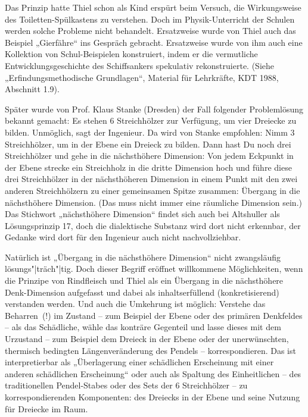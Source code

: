 \documentclass[11pt,a4paper]{article}
\begin{document}
Das Prinzip hatte Thiel schon als Kind erspürt beim Versuch, die Wirkungsweise
des Toiletten-Spülkastens zu verstehen. Doch im Physik-Unterricht der Schulen
werden solche Probleme nicht behandelt.  Ersatzweise wurde von Thiel auch das
Beispiel „Gierfähre“ ins Gespräch gebracht. Ersatzweise wurde von ihm auch eine
Kollektion von Schul-Beispielen konstruiert, indem er die vermutliche
Entwicklungsgeschichte des Schiffsankers spekulativ rekonstruierte. (Siehe
„Erfindungsmethodische Grundlagen“, Material für Lehrkräfte, KDT 1988,
Abschnitt 1.9).

Später wurde von Prof. Klaus Stanke (Dresden) der Fall folgender Problemlösung
bekannt gemacht: Es stehen 6 Streichhölzer zur Verfügung, um vier Dreiecke zu
bilden. Unmöglich, sagt der Ingenieur. Da wird von Stanke empfohlen: Nimm 3
Streichhölzer, um in der Ebene ein Dreieck zu bilden. Dann hast Du noch drei
Streichhölzer und gehe in die nächsthöhere Dimension: Von jedem Eckpunkt in der
Ebene strecke ein Streichholz in die dritte Dimension hoch und führe diese drei
Streichhölzer in der nächsthöheren Dimension in einem Punkt mit den zwei
anderen Streichhölzern zu einer gemeinsamen Spitze zusammen: Übergang in die
nächsthöhere Dimension. (Das muss nicht immer eine räumliche Dimension sein.)
Das Stichwort „nächsthöhere Dimension“ findet sich auch bei Altshuller als
Lösungsprinzip 17, doch die dialektische Substanz wird dort nicht erkennbar,
der Gedanke wird dort für den Ingenieur auch nicht nachvollziehbar.

Natürlich ist „Übergang in die nächsthöhere Dimension“ nicht zwangsläufig
lösungs"|träch"|tig. Doch dieser Begriff eröffnet willkommene Möglichkeiten,
wenn die Prinzipe von Rindfleisch und Thiel als ein Übergang in die
nächsthöhere Denk-Dimension aufgefasst und dabei als inhaltserfüllend
(konkretisierend) verstanden werden. Und auch die Umkehrung ist möglich:
Verstehe das Beharren~(!) im Zustand – zum Beispiel der Ebene oder des primären
Denkfeldes -- als das Schädliche, wähle das konträre Gegenteil und lasse dieses
mit dem Urzustand – zum Beispiel dem Dreieck in der Ebene oder der
unerwünschten, thermisch bedingten Längenveränderung des Pendels –
korrespondieren. Das ist interpretierbar als „Überlagerung einer schädlichen
Erscheinung mit einer anderen schädlichen Erscheinung“ oder auch als Spaltung
des Einheitlichen – des traditionellen Pendel-Stabes oder des Sets der 6
Streichhölzer -- zu korrespondierenden Komponenten: des Dreiecks in der Ebene
und seine Nutzung für Dreiecke im Raum.
\end{document}
